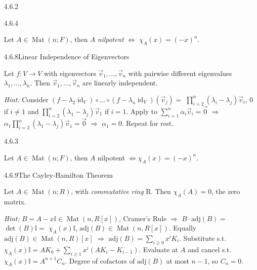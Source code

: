 \documentclass[10pt]{article} %
\renewcommand{\geq}{\geqslant}
\DeclareMathOperator{\Mat}{Mat}
\newcommand{\Hint}{\vspace{0.2em}\textit{Hint: }}
\DeclareMathOperator{\id}{id}
\begin{document}
\begin{multicols}{3}
\begin{remark}{4.6.2}{}
\end{remark}

\begin{remark}{4.6.4}{}

    Let $A \in \Mat(n;F)$, then $A$ \emph{nilpotent} $\Leftrightarrow$ $\chi_A(x) = (-x)^n$.

\end{remark}

\begin{lemma}{4.6.8}{Linear Independence of Eigenvectors}

    Let $f: V \to V$ with eigenvectors $\vec{v}_1,\hdots,\vec{v}_n$ with pairwise different eigenvalues $\lambda_1,\hdots,\lambda_n$. Then $\vec{v}_1,\hdots,\vec{v}_n$ are linearly independent.

    \Hint Consider $(f-\lambda_2 \id_V) \circ \hdots \circ (f - \lambda_n \id_V)(\vec{v}_j) = $ $\prod_{i=2}^n (\lambda_i - \lambda_j)\vec{v}_i$, $0$ if $i \neq 1$ and $\prod_{i=2}^n (\lambda_1 - \lambda_j)\vec{v}_1$ if $i = 1$. Apply to $\sum_{i=1}^n \alpha_i \vec{v}_i = \vec{0}$ $\Rightarrow$ $\alpha_1 \prod_{i=2}^n (\lambda_1 - \lambda_j)\vec{v}_1 = \vec{0}$ $\Rightarrow$ $\alpha_1 = 0$. Repeat for rest.

\end{lemma}

\begin{remark}{4.6.3}{}

    Let $A \in \Mat(n;F)$, then $A$ nilpotent $\Leftrightarrow \chi_A(x) = (-x)^n$.

\end{remark}

\begin{theorem}{4.6.9}{The Cayley-Hamilton Theorem}

    Let $A \in \Mat(n;R)$, with \emph{commutative ring} R. Then $\chi_A(A) = 0$, the zero matrix.

    \Hint $B = A - x\mathbb{I} \in \Mat(n,R[x])$, Cramer's Rule $\Rightarrow$ $B \cdot \mathrm{adj}(B) =$ $\det(B)\mathbb{I} =$ $\chi_A(x) \mathbb{I}$, $\mathrm{adj}(B) \in \Mat(n,R[x])$. Equally $\mathrm{adj}(B) \in \Mat(n,R)[x]$ $\Rightarrow$ $\mathrm{adj}(B) = \sum_{i \geq 0} x^i K_i$. Substitute s.t. $\chi_A(x) \mathbb{I} = AK_0 + \sum_{i \geq 1} x^i (AK_i - K_{i-1})$. Evaluate at $A$ and cancel s.t. $\chi_A(x) \mathbb{I} = A^{n+1}C_n$. Degree of cofactors of $\mathrm{adj}(B)$ at most $n-1$, so $C_n = 0$.


\end{theorem}
\end{multicols}
\end{document}

